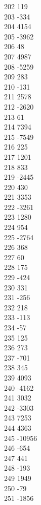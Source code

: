 { 202	119 \\
 203	-334 \\
 204	4154 \\
 205	-3962 \\
 206	48 \\
 207	4987 \\
 208	-5259 \\
 209	283 \\
 210	-131 \\
 211	2578 \\
 212	-2620 \\
 213	61 \\
 214	7394 \\
 215	-7549 \\
 216	225 \\
 217	1201 \\
 218	833 \\
 219	-2445 \\
 220	430 \\
 221	3353 \\
 222	-3261 \\
 223	1280 \\
 224	954 \\
 225	-2764 \\
 226	368 \\
 227	60 \\
 228	175 \\
 229	-424 \\
 230	331 \\
 231	-256 \\
 232	218 \\
 233	-113 \\
 234	-57 \\
 235	125 \\
 236	273 \\
 237	-701 \\
 238	345 \\
 239	4093 \\
 240	-4162 \\
 241	3032 \\
 242	-3303 \\
 243	7253 \\
 244	4363 \\
 245	-10956 \\
 246	-654 \\
 247	441 \\
 248	-193 \\
 249	1949 \\
 250	-79 \\
 251	-1856 \\
}
